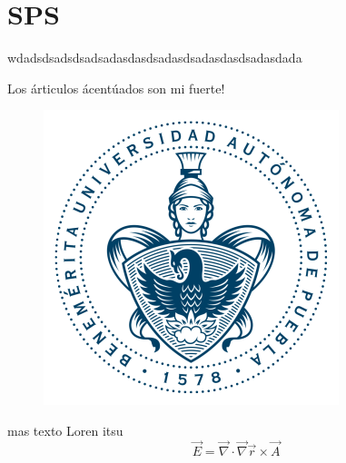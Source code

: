 \chapter{SPS}
wdadsdsadsdsadsadasdasdsadasdsadasdasdsadasdada
            
Los árticulos ácentúados son mi fuerte!
\begin{figure}[!h]
\centering
\includegraphics[width=.2\textwidth,keepaspectratio=true]{escudo-2}
\end{figure}

mas texto Loren itsu
\[ \vec E = \vec \nabla \cdot \vec \nabla \vec r \times \vec A
\]
